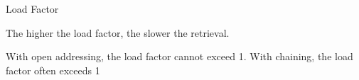 \begin{frame}{Load Factor}
    \begin{block}{}
      \centering
      The higher the load factor, the slower the retrieval.
    \end{block}  
    \begin{block}{}
      \centering
      With open addressing, the load factor cannot exceed 1. With chaining, the load factor often exceeds 1
    \end{block}  
\end{frame}

